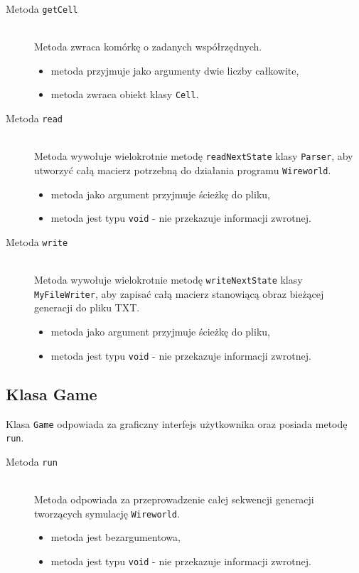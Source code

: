 \documentclass[a4paper,12pt,oneside]{article}
\begin{document}
\begin{description}
\item[Metoda \texttt{getCell}] \hfill \\
Metoda zwraca komórkę o zadanych współrzędnych.
\begin{itemize}
\item metoda przyjmuje jako argumenty dwie liczby całkowite,
\item metoda zwraca obiekt klasy \verb+Cell+.
\end{itemize}

\item[Metoda \texttt{read}] \hfill \\
Metoda wywołuje wielokrotnie metodę \verb+readNextState+ klasy \verb+Parser+, aby utworzyć całą macierz potrzebną do działania programu \verb+Wireworld+.
\begin{itemize}
\item metoda jako argument przyjmuje ścieżkę do pliku,
\item metoda jest typu \verb+void+ - nie przekazuje informacji zwrotnej.
\end{itemize}

\item[Metoda \texttt{write}] \hfill \\
Metoda wywołuje wielokrotnie metodę \verb+writeNextState+ klasy \verb+MyFileWriter+, aby zapisać całą macierz stanowiącą obraz bieżącej generacji do pliku TXT.
\begin{itemize}
\item metoda jako argument przyjmuje ścieżkę do pliku,
\item metoda jest typu \verb+void+ - nie przekazuje informacji zwrotnej.
\end{itemize}

\end{description}

\subsection{Klasa Game}

Klasa \verb+Game+ odpowiada za graficzny interfejs użytkownika oraz posiada metodę \verb+run+.

\begin{description}
\item[Metoda \texttt{run}] \hfill \\
Metoda odpowiada za przeprowadzenie całej sekwencji generacji tworzących symulację \verb+Wireworld+.
\begin{itemize}
\item metoda jest bezargumentowa,
\item metoda jest typu \verb+void+ - nie przekazuje informacji zwrotnej.
\end{itemize}

\end{description}
\end{document}
